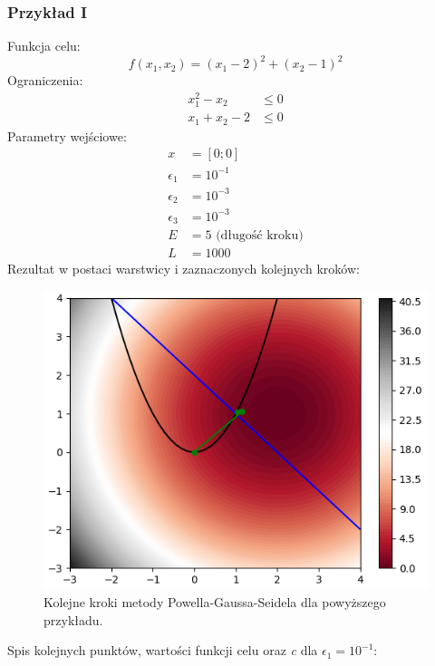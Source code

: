 \documentclass[a4paper,12pt]{article}
\begin{document}
\subsubsection{Przykład I}
Funkcja celu:
\begin{equation}
    f(x_{1}, x_{2}) = (x_{1} - 2)^{2} + (x_{2} - 1)^{2}
\end{equation}
Ograniczenia:
\begin{equation}
    \begin{split}
        x_{1}^{2} - x_{2} &\leq 0 \\
        x_{1} + x_{2} - 2 &\leq 0
    \end{split}
\end{equation}
Parametry wejściowe:
\begin{align*}
    x &= [0; 0] \\
    \epsilon_{1} &= 10^{-1} \\
    \epsilon_{2} &= 10^{-3} \\
    \epsilon_{3} &= 10^{-3} \\
    E &= 5 \mbox{ (długość kroku)}\\
    L &= 1000
\end{align*}
Rezultat w postaci warstwicy i zaznaczonych kolejnych kroków:
\begin{figure}[H]
    \centering
    \includegraphics[width=\textwidth]{images/p_plot1.png}
    \caption{Kolejne kroki metody Powella-Gaussa-Seidela dla powyższego przykładu.}
    \label{uml_gauss_seidel}
\end{figure}
Spis kolejnych punktów, wartości funkcji celu oraz \textit{c}  dla $\epsilon_{1} = 10^{-1}$:
\end{document}
